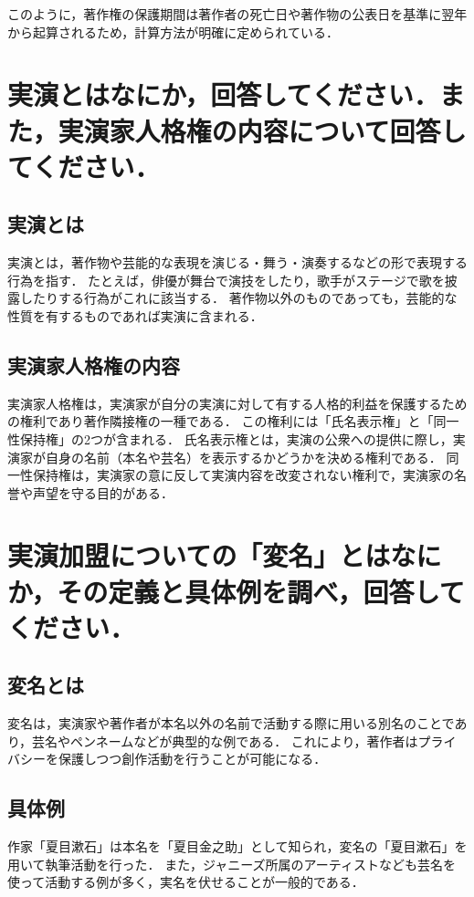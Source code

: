 \documentclass[titlepage,a4paper]{jsarticle}
\begin{document}
このように，著作権の保護期間は著作者の死亡日や著作物の公表日を基準に翌年から起算されるため，計算方法が明確に定められている．

\section{実演とはなにか，回答してください．また，実演家人格権の内容について回答してください．}
\subsection{実演とは}
実演とは，著作物や芸能的な表現を演じる・舞う・演奏するなどの形で表現する行為を指す．
たとえば，俳優が舞台で演技をしたり，歌手がステージで歌を披露したりする行為がこれに該当する．
著作物以外のものであっても，芸能的な性質を有するものであれば実演に含まれる\cite{q3}．

\subsection{実演家人格権の内容}
実演家人格権は，実演家が自分の実演に対して有する人格的利益を保護するための権利であり著作隣接権の一種である．
この権利には「氏名表示権」と「同一性保持権」の2つが含まれる．
氏名表示権とは，実演の公衆への提供に際し，実演家が自身の名前（本名や芸名）を表示するかどうかを決める権利である．
同一性保持権は，実演家の意に反して実演内容を改変されない権利で，実演家の名誉や声望を守る目的がある\cite{q3_1}．

\section{実演加盟についての「変名」とはなにか，その定義と具体例を調べ，回答してください．}
\subsection{変名とは}
変名は，実演家や著作者が本名以外の名前で活動する際に用いる別名のことであり，芸名やペンネームなどが典型的な例である．
これにより，著作者はプライバシーを保護しつつ創作活動を行うことが可能になる\cite{henmei}．

\subsection{具体例}
作家「夏目漱石」は本名を「夏目金之助」として知られ，変名の「夏目漱石」を用いて執筆活動を行った．
また，ジャニーズ所属のアーティストなども芸名を使って活動する例が多く，実名を伏せることが一般的である\cite{q4_1}．
\end{document}
